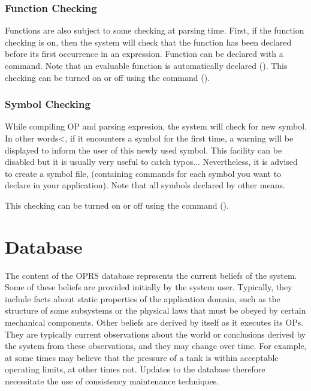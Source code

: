 \subsection{Function Checking}

Functions are also subject to some checking at parsing time. First, if the
function checking is on, then the system will check that the function has been
declared before its first occurrence in an expression. Function can be declared
with a  command. Note that an evaluable function is
automatically declared ().  This
checking can be turned on or off using the  command
().

\subsection{Symbol Checking}

While compiling OP and parsing expresion, the system will check for new
symbol. In other words<, if it encounters a symbol for the first time, a warning
will be displayed to inform the user of this newly used symbol. This facility
can be disabled but it is usually very useful to catch typos... Nevertheless,
it is advised to create a symbol file, (containing  commands for
each symbol you want to declare in your application). Note that all symbols
declared by other means. 

This checking can be turned on or off using the 
command ().

\chapter{Database}

The content of the OPRS database represents the current beliefs of the
system. Some of these beliefs are provided initially by the system user.
Typically, they include facts about static properties of the application
domain, such as the structure of some subsystems or the physical laws that
must be obeyed by certain mechanical components. Other beliefs are derived
by \COPRS{} itself as it executes its OPs. They are typically current
observations about the world or conclusions derived by the system from
these observations, and they may change over time. For example, at some
times \COPRS{} may believe that the pressure of a tank is within acceptable
operating limits, at other times not. Updates to the database therefore
necessitate the use of consistency maintenance techniques.

